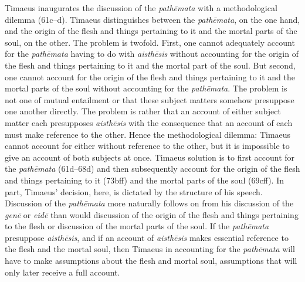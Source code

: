 Timaeus inaugurates the discussion of the \emph{pathēmata} with a methodological dilemma (61c--d). Timaeus distinguishes between the \emph{pathēmata}, on the one hand, and the origin of the flesh and things pertaining to it and the mortal parts of the soul, on the other. The problem is twofold. First, one cannot adequately account for the \emph{pathēmata} having to do with \emph{aisthēsis} without accounting for the origin of the flesh and things pertaining to it and the mortal part of the soul. But second, one cannot account for the origin of the flesh and things pertaining to it and the mortal parts of the soul without accounting for the \emph{pathēmata}. The problem is not one of mutual entailment or that these subject matters somehow presuppose one another directly. The problem is rather that an account of either subject matter each presupposes \emph{aisthēsis} with the consequence that an account of each must make reference to the other. Hence the methodological dilemma: Timaeus cannot account for either without reference to the other, but it is impossible to give an account of both subjects at once. Timaeus solution is to first account for the \emph{pathēmata} (61d--68d) and then subsequently account for the origin of the flesh and things pertaining to it (73bff) and the mortal parts of the soul (69cff). In part, Timaeus' decision, here, is dictated by the structure of his speech. Discussion of the \emph{pathēmata} more naturally follows on from his discussion of the \emph{genē} or \emph{eidē} than would discussion of the origin of the flesh and things pertaining to the flesh or discussion of the mortal parts of the soul. If the \emph{pathēmata} presuppose \emph{aisthēsis}, and if an account of \emph{aisthēsis} makes essential reference to the flesh and the mortal soul, then Timaeus in accounting for the \emph{pathēmata} will have to make assumptions about the flesh and mortal soul, assumptions that will only later receive a full account.

